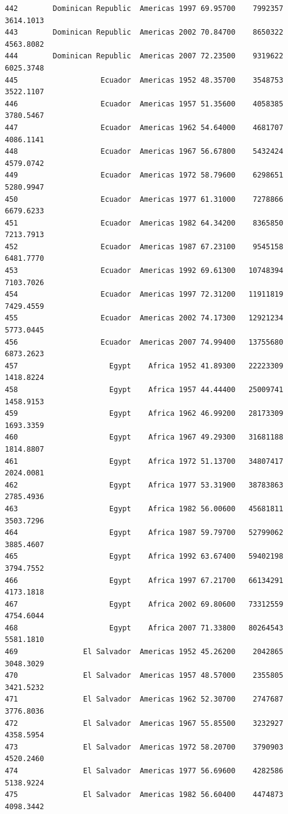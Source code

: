 \documentclass[
  letterpaper,
  DIV=11,
  numbers=noendperiod]{scrreprt}
\begin{document}
\begin{verbatim}
442        Dominican Republic  Americas 1997 69.95700    7992357   3614.1013
443        Dominican Republic  Americas 2002 70.84700    8650322   4563.8082
444        Dominican Republic  Americas 2007 72.23500    9319622   6025.3748
445                   Ecuador  Americas 1952 48.35700    3548753   3522.1107
446                   Ecuador  Americas 1957 51.35600    4058385   3780.5467
447                   Ecuador  Americas 1962 54.64000    4681707   4086.1141
448                   Ecuador  Americas 1967 56.67800    5432424   4579.0742
449                   Ecuador  Americas 1972 58.79600    6298651   5280.9947
450                   Ecuador  Americas 1977 61.31000    7278866   6679.6233
451                   Ecuador  Americas 1982 64.34200    8365850   7213.7913
452                   Ecuador  Americas 1987 67.23100    9545158   6481.7770
453                   Ecuador  Americas 1992 69.61300   10748394   7103.7026
454                   Ecuador  Americas 1997 72.31200   11911819   7429.4559
455                   Ecuador  Americas 2002 74.17300   12921234   5773.0445
456                   Ecuador  Americas 2007 74.99400   13755680   6873.2623
457                     Egypt    Africa 1952 41.89300   22223309   1418.8224
458                     Egypt    Africa 1957 44.44400   25009741   1458.9153
459                     Egypt    Africa 1962 46.99200   28173309   1693.3359
460                     Egypt    Africa 1967 49.29300   31681188   1814.8807
461                     Egypt    Africa 1972 51.13700   34807417   2024.0081
462                     Egypt    Africa 1977 53.31900   38783863   2785.4936
463                     Egypt    Africa 1982 56.00600   45681811   3503.7296
464                     Egypt    Africa 1987 59.79700   52799062   3885.4607
465                     Egypt    Africa 1992 63.67400   59402198   3794.7552
466                     Egypt    Africa 1997 67.21700   66134291   4173.1818
467                     Egypt    Africa 2002 69.80600   73312559   4754.6044
468                     Egypt    Africa 2007 71.33800   80264543   5581.1810
469               El Salvador  Americas 1952 45.26200    2042865   3048.3029
470               El Salvador  Americas 1957 48.57000    2355805   3421.5232
471               El Salvador  Americas 1962 52.30700    2747687   3776.8036
472               El Salvador  Americas 1967 55.85500    3232927   4358.5954
473               El Salvador  Americas 1972 58.20700    3790903   4520.2460
474               El Salvador  Americas 1977 56.69600    4282586   5138.9224
475               El Salvador  Americas 1982 56.60400    4474873   4098.3442

\end{verbatim}
\end{document}

